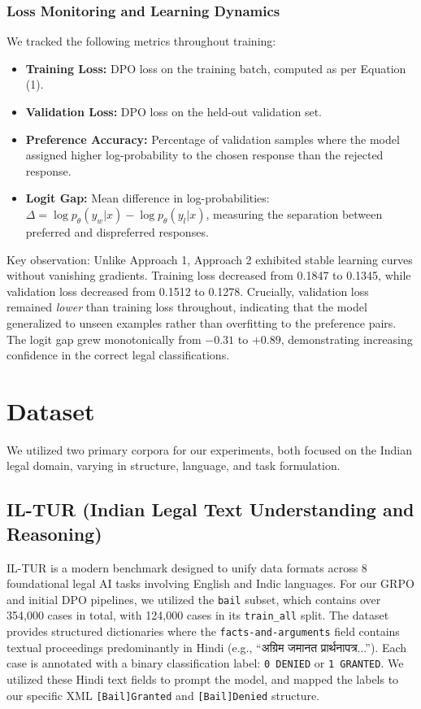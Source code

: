\documentclass[conference]{IEEEtran}
\begin{document}
\subsubsection{Loss Monitoring and Learning Dynamics}
We tracked the following metrics throughout training:
\begin{itemize}
    \item \textbf{Training Loss:} DPO loss on the training batch, computed as per Equation (1).
    \item \textbf{Validation Loss:} DPO loss on the held-out validation set.
    \item \textbf{Preference Accuracy:} Percentage of validation samples where the model assigned higher log-probability to the chosen response than the rejected response.
    \item \textbf{Logit Gap:} Mean difference in log-probabilities: $\Delta = \log p_\theta(y_w | x) - \log p_\theta(y_l | x)$, measuring the separation between preferred and dispreferred responses.
\end{itemize}

Key observation: Unlike Approach 1, Approach 2 exhibited stable learning curves without vanishing gradients. Training loss decreased from 0.1847 to 0.1345, while validation loss decreased from 0.1512 to 0.1278. Crucially, validation loss remained \textit{lower} than training loss throughout, indicating that the model generalized to unseen examples rather than overfitting to the preference pairs. The logit gap grew monotonically from $-0.31$ to $+0.89$, demonstrating increasing confidence in the correct legal classifications.



\section{Dataset}
We utilized two primary corpora for our experiments, both focused on the Indian legal domain, varying in structure, language, and task formulation.

\subsection{IL-TUR (Indian Legal Text Understanding and Reasoning)}
IL-TUR is a modern benchmark designed to unify data formats across 8 foundational legal AI tasks involving English and Indic languages. For our GRPO and initial DPO pipelines, we utilized the \texttt{bail} subset, which contains over 354,000 cases in total, with 124,000 cases in its \texttt{train\_all} split. The dataset provides structured dictionaries where the \texttt{facts-and-arguments} field contains textual proceedings predominantly in Hindi (e.g., ``अग्रिम जमानत प्रार्थनापत्र...''). Each case is annotated with a binary classification label: \texttt{0 DENIED} or \texttt{1 GRANTED}. We utilized these Hindi text fields to prompt the model, and mapped the labels to our specific XML \texttt{[Bail]Granted} and \texttt{[Bail]Denied} structure.
\end{document}
